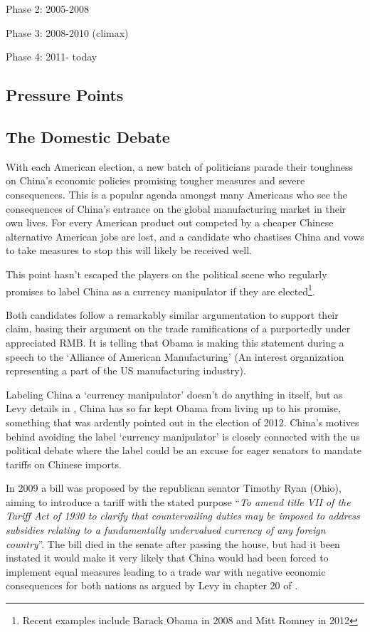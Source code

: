 Phase 2: 2005-2008

Phase 3: 2008-2010 (climax)

Phase 4: 2011- today


\subsection{Pressure Points}


\subsection{The Domestic Debate}
With each American election, a new batch of politicians parade their 
toughness on China's economic policies promising tougher measures and 
severe consequences. This is a popular agenda amongst many Americans who 
see the consequences of China's entrance on the global manufacturing 
market in their own lives. For every American product out competed by a 
cheaper Chinese alternative American jobs are lost, and a candidate who 
chastises China and vows to take measures to stop this will likely be 
received well.

This point hasn't escaped the players on the political scene who 
regularly promises to label China as a currency manipulator if they are 
elected\footnote{Recent examples include Barack Obama in 
2008\cite{Obama2008} and Mitt Romney in 2012\cite{Romney2012}}.  

Both candidates follow a remarkably similar argumentation to support 
their claim, basing their argument on the trade ramifications of a 
purportedly under appreciated RMB.  It is telling that Obama is making 
this statement during a speech to the `Alliance of American 
Manufacturing' (An interest organization representing a part of the US 
manufacturing industry).

Labeling China a `currency manipulator' doesn't do anything in itself, 
but as Levy details in \cite{Levy11}, China has so far kept Obama from 
living up to his promise, something that was ardently pointed out in the 
election of 2012. China's motives behind avoiding the label `currency 
manipulator' is closely connected with the us political debate where the 
label could be an excuse for eager senators to mandate tariffs on 
Chinese imports.

In 2009 a bill was proposed by the republican senator Timothy Ryan 
(Ohio), aiming to introduce a tariff with the stated purpose 
``\textit{To amend title VII of the Tariff Act of 1930 to clarify that 
	countervailing duties may be imposed to address subsidies relating 
	to a fundamentally undervalued currency of any foreign 
country}''\cite{Ryan2009}. The bill died in the senate after passing the 
house, but had it been instated it would make it very likely that China 
would had been forced to implement equal measures leading to a trade war 
with negative economic consequences for both nations as argued by Levy 
in chapter 20 of \cite{Evenett10}.

